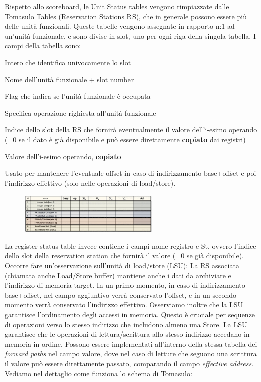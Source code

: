 Rispetto allo scoreboard, le Unit Status tables vengono rimpiazzate dalle Tomasulo Tables (Reservation Stations RS), che in generale possono essere più delle unità funzionali. Queste tabelle vengono assegnate in rapporto n:1 ad un'unità funzionale, e sono divise in slot, uno per ogni riga della singola tabella. I campi della tabella sono:

\begin{description}[style=nextline,leftmargin=3.45cm,labelwidth=2.8cm,labelsep=0.4cm,font=\ttfamily\bfseries, itemsep=0.01em]
\item[id] Intero che identifica univocamente lo slot
\item[name] Nome dell'unità funzionale + slot number
\item[busy] Flag che indica se l'unità funzionale è occupata
\item[op] Specifica operazione righiesta all'unità funzionale 
\item[$st_i$] Indice dello slot della RS che fornirà eventualmente il valore dell'i-esimo operando (=0 se il dato è già disponibile e può essere direttamente \textbf{copiato} dai registri) 
\item[$V_i$] Valore dell'i-esimo operando, \textbf{copiato} 
\item[$Ad$] Usato per mantenere l'eventuale offset in caso di indirizzamento base+offset e poi l'indirizzo effettivo (solo nelle operazioni di load/store).  
\end{description}


\begin{figure}[ht]
    \centering
    \includegraphics[width=0.6\textwidth]{fig/chapter_2/tomasulo_tables.png}
\end{figure}

\noindent La register status table invece contiene i campi nome registro e St, ovvero l'indice dello slot della reservation station che fornirà il valore (=0 se già disponibile). 
Occorre fare un'osservazione sull'unità di load/store (LSU): La RS associata (chiamata anche Load/Store buffer) mantiene anche i dati da archiviare e l'indirizzo di memoria target. In un primo momento, in caso di indirizzamento base+offset, nel campo aggiuntivo verrà conservato l'offset, e in un secondo momento verrà conservato l'indirizzo effettivo. Osserviamo inoltre che la LSU garantisce l'ordinamento degli accessi in memoria. Questo è cruciale per sequenze di operazioni verso lo stesso indirizzo che includono almeno una Store. La LSU garantisce che le operazioni di lettura/scrittura allo stesso indirizzo accedano in memoria in ordine. Possono essere implementati all'interno della stessa tabella dei \textit{forward paths} nel campo valore, dove nel caso di letture che seguono una scrittura il valore può essere direttamente passato, comparando il campo \textit{effective address}.
\\ \noindent Vediamo nel dettaglio come funziona lo schema di Tomasulo:

